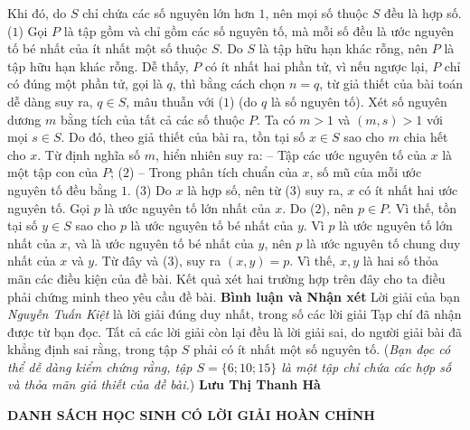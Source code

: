 \begin{multicols}{2}
	\vskip 0.05cm
	Khi đó, do $S$ chỉ chứa các số nguyên lớn hơn $1$, nên mọi số thuộc $S$ đều là hợp số. \hfill ($1$)
	\vskip 0.05cm
	Gọi $P$ là tập gồm và chỉ gồm các số nguyên tố, mà mỗi số đều là ước nguyên tố bé nhất của ít nhất một số thuộc $S$.
	\vskip 0.05cm
	Do $S$ là tập hữu hạn khác rỗng, nên $P$ là tập hữu hạn khác rỗng.
	\vskip 0.05cm
	Dễ thấy, $P$ có ít nhất hai phần tử, vì nếu ngược lại, $P$ chỉ có đúng một phần tử, gọi là $q$, thì bằng cách chọn $n = q$, từ giả thiết của bài toán dễ dàng suy ra, $q \in S$, mâu thuẫn với ($1$) (do $q$ là số nguyên tố).
	\vskip 0.05cm
	Xét số nguyên dương $m$ bằng tích của tất cả các số thuộc $P$.
	\vskip 0.05cm
	Ta có $m > 1$ và $(m,s) > 1$ với mọi $s \in S$. Do đó, theo giả thiết của bài ra, tồn tại số $x \in S$ sao cho $m$ chia hết cho $x$.
	\vskip 0.05cm
	Từ định nghĩa số $m$, hiển nhiên suy ra:
	\vskip 0.05cm
	-- Tập các ước nguyên tố của $x$ là một tập con của $P$; \hfill ($2$)
	\vskip 0.05cm
	-- Trong phân tích chuẩn của $x$, số mũ của mỗi ước nguyên tố đều bằng $1$.       \hfill ($3$)
	\vskip 0.05cm
	Do $x$ là hợp số, nên từ ($3$) suy ra, $x$ có ít nhất hai ước nguyên tố. 
	Gọi $p$ là ước nguyên tố lớn nhất của $x$. Do ($2$), nên $p \in P$. Vì thế, tồn tại số $y \in S$ sao cho $p$ là ước nguyên tố bé nhất của $y$.
	\vskip 0.05cm
	Vì $p$ là ước nguyên tố lớn nhất của $x$, và là ước nguyên tố bé nhất của $y$, nên $p$ là ước nguyên tố chung duy nhất của $x$ và $y$. Từ đây và ($3$), suy ra $(x, y) = p$. Vì thế, $x, y$ là hai số thỏa mãn các điều kiện của đề bài.
	\vskip 0.05cm
	Kết quả xét hai trường hợp trên đây cho ta điều phải chứng minh theo yêu cầu đề bài.
	\vskip 0.05cm
	\textbf{\color{thachthuctoanhoc}Bình luận và Nhận xét}
	\vskip 0.05cm
	Lời giải của bạn \textit{Nguyễn Tuấn Kiệt} là lời giải đúng duy nhất, trong số các lời giải Tạp chí đã nhận được từ bạn đọc. Tất cả các lời giải còn lại đều là lời giải sai, do người giải bài đã khẳng định sai rằng, trong tập $S$ phải có ít nhất một số nguyên tố. (\textit{Bạn đọc có thể dễ dàng kiểm chứng rằng, tập $S = \{6; 10; 15\}$ là một tập chỉ chứa các hợp số và thỏa mãn giả thiết của đề bài.})
	\vskip 0.05cm
	\hfill	\textbf{\color{thachthuctoanhoc}Lưu Thị Thanh Hà}
\end{multicols}
\begin{center}
	\textbf{\color{thachthuctoanhoc}DANH SÁCH HỌC SINH CÓ LỜI GIẢI HOÀN CHỈNH}
\end{center}
